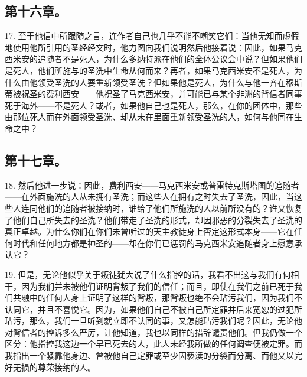 
\subsection{第十六章。}

17. 至于他信中所跟随之言，连作者自己也几乎不能不嘲笑它们：当他无知而虚假地使用他所引用的圣经经文时，他力图向我们说明然后他接着说：因此，如果马克西米安的追随者不是死人，为什么多纳特派在他们的全体公议会中说？但如果他们是死人，他们所施与的圣洗中生命从何而来？再者，如果马克西米安不是死人，为什么由他领受圣洗的人要重新领受圣洗？但如果他是死人，为什么与他一齐在穆斯蒂被祝圣的费利西安——他祝圣了马克西米安，并可能已与某个非洲的背信者同事死于海外——不是死人？或者，如果他自己也是死人，那么，在你的团体中，那些由那位死人而在外面领受圣洗、却从未在里面重新领受圣洗的人，如何与他同在生命之中？\par


\subsection{第十七章。}

18. 然后他进一步说：因此，费利西安——马克西米安或普雷特克斯塔图的追随者——在外面施洗的人从未拥有圣洗；而这些人在拥有之时失去了圣洗，因此，当这些人连同他们的追随者被接纳时，谁给了他们所施洗的人以前所没有的？谁又恢复了他们自己所失去的圣洗？他们带走了圣洗的形式，却因邪恶的分裂失去了圣洗的真正卓越。为什么你们在你们未曾听过的天主教徒身上否定这形式本身——它在任何时代和任何地方都是神圣的——却在你们已惩罚的马克西米安追随者身上愿意承认它？\par

19. 但是，无论他似乎关于叛徒犹大说了什么指控的话，我看不出这与我们有何相干，因为我们并未被他们证明背叛了我们的信任；而且，即使在我们之前已死于我们共融中的任何人身上证明了这样的背叛，那背叛也绝不会玷污我们，因为我们不认同它，并且不喜悦它。因为，如果他们自己不被自己所定罪并后来宽恕的过犯所玷污，那么，我们一旦听到就立即不认同的事，又怎能玷污我们呢？因此，无论他对背信者的控诉多么严厉，让他知道，我也以同样的措辞谴责他们。但我仍做一个区分：他指控我这边一个早已死去的人，此人未经我所做的任何调查便被定罪。而我指出一个紧靠他身边、曾被他自己定罪或至少因亵渎的分裂而分离、而他又以完好无损的尊荣接纳的人。\par

